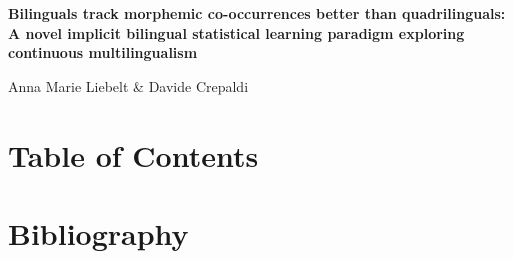 \documentclass[11pt]{article}
\begin{document}

\begin{titlepage}

\vspace*{7cm}
\begin{center}
{\LARGE \textbf{Bilinguals track morphemic co-occurrences better than quadrilinguals: A novel implicit bilingual statistical learning paradigm exploring continuous multilingualism}}
    
    \vspace{1cm}
    {\LARGE Anna Marie Liebelt \& Davide Crepaldi}
    
    \vspace*{6cm}
\end{center}

\end{titlepage}

\section*{Table of Contents}
\makeatletter
{}
\makeatother

\justifying





























\section{Bibliography}
\bibnamesep=0.5cm
\printbibliography[heading=none]
\nocite{*}

\pagebreak
\end{document}
